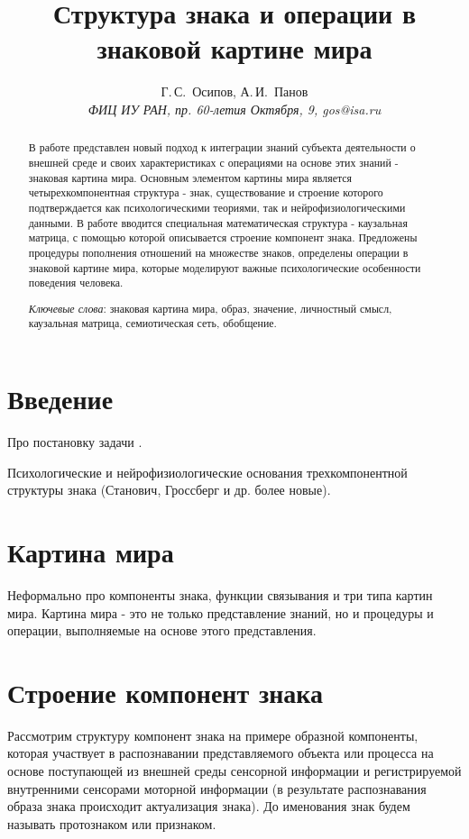 \documentclass[12pt]{scrartcl}
\title{Структура знака и операции в знаковой картине мира}
\author{Г.\,С.~Осипов, А.\,И.~Панов\\
	{\large\slshape ФИЦ ИУ РАН, пр. 60-летия Октября, 9, gos@isa.ru}}
\begin{document}
	
	\maketitle{}
	\begin{abstract}
		В работе представлен новый подход к интеграции знаний субъекта деятельности о внешней среде и своих характеристиках с операциями на основе этих знаний - знаковая картина мира. Основным элементом картины мира является четырехкомпонентная структура - знак, существование и строение которого подтверждается как психологическими теориями, так и нейрофизиологическими данными. В работе вводится специальная математическая структура - каузальная матрица, с помощью которой описывается строение компонент знака. Предложены процедуры пополнения отношений на множестве знаков, определены операции в знаковой картине мира, которые моделируют важные психологические особенности поведения человека.
		\par\bigskip
		\textit{Ключевые слова}: знаковая картина мира, образ, значение, личностный смысл, каузальная матрица, семиотическая сеть, обобщение.
	\end{abstract}
	
	
	\section*{Введение}
	Про постановку задачи \cite{Osipov2014c,Osipov2015d}.
	
	Психологические и нейрофизиологические основания трехкомпонентной структуры знака (Станович, Гроссберг и др. более новые).
	
	\section{Картина мира}

	Неформально про компоненты знака, функции связывания и три типа картин мира. Картина мира - это не только представление знаний, но и процедуры и операции, выполняемые на основе этого представления.
	
	\section{Строение компонент знака}
	
	Рассмотрим структуру компонент знака на примере образной компоненты, которая участвует в распознавании представляемого объекта или процесса на основе поступающей из внешней среды сенсорной информации и регистрируемой внутренними сенсорами моторной информации (в результате распознавания образа знака происходит актуализация знака). До именования знак будем называть протознаком или признаком.
	
\end{document}
